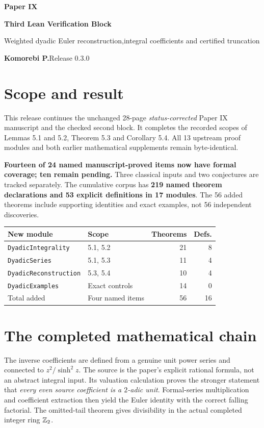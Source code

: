 \documentclass[11pt]{article}
\begin{document}
{\LARGE\bfseries\color{ink}Paper IX}\par
{\Large\bfseries Third Lean Verification Block}\par
{\large Weighted dyadic Euler reconstruction,\newline integral coefficients and certified truncation}\par
\textbf{Komorebi P.}\hfill Release 0.3.0
\bigskip
\section*{Scope and result}
This release continues the unchanged 28-page \emph{status-corrected} Paper IX manuscript and the checked second block. It completes the recorded scopes of Lemmas 5.1 and 5.2, Theorem 5.3 and Corollary 5.4. All 13 upstream proof modules and both earlier mathematical supplements remain byte-identical.

\textbf{Fourteen of 24 named manuscript-proved items now have formal coverage; ten remain pending.} Three classical inputs and two conjectures are tracked separately. The cumulative corpus has \textbf{219 named theorem declarations and 53 explicit definitions in 17 modules}. The 56 added theorems include supporting identities and exact examples, not 56 independent discoveries.

\begin{center}
\begin{tabular}{@{}p{}p{}rr@{}}
\toprule
New module & Scope & Theorems & Defs.\\\midrule
\texttt{DyadicIntegrality} & 5.1, 5.2 & 21 & 8\\
\texttt{DyadicSeries} & 5.1, 5.3 & 11 & 4\\
\texttt{DyadicReconstruction} & 5.3, 5.4 & 10 & 4\\
\texttt{DyadicExamples} & Exact controls & 14 & 0\\\midrule
Total added & Four named items & 56 & 16\\\bottomrule
\end{tabular}
\end{center}

\section*{The completed mathematical chain}
The inverse coefficients are defined from a genuine unit power series and connected to $z^2/\sinh^2z$. The source is the paper's explicit rational formula, not an abstract integral input. Its valuation calculation proves the stronger statement that \emph{every even source coefficient is a $2$-adic unit}. Formal-series multiplication and coefficient extraction then yield the Euler identity with the correct falling factorial. The omitted-tail theorem gives divisibility in the actual completed integer ring $\mathbb Z_2$.
\end{document}
